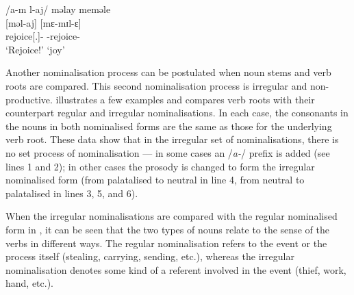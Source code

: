 \ea \label{ex:4:19}
\textup{/a-m l-aj/ \hspace{10pt}   məlay  \hspace{70pt}    meməle}\\
\hspace{55pt}   [məl-aj]  \hspace{60pt}    [mɛ-mɪl-ɛ]\\
\hspace{55pt}      rejoice[{\twoS}.{\IMP}]-{\CL} \hspace{20pt} {\NOM}{}-rejoice-{\CL}\\
\glt \hspace{55pt} ‘Rejoice!’ \hspace{55pt}   ‘joy’
\z

Another nominalisation process can be postulated when noun stems and verb roots are compared. This second nominalisation process is irregular and non-productive.  illustrates a few examples and compares verb roots with their counterpart regular and irregular nominalisations. In each case, the consonants in the nouns in both nominalised forms are the same as those for the underlying verb root. These data show that in the irregular set of nominalisations, there is no set process of nominalisation --- in some cases an /\textit{a-}/ prefix is added (see lines 1 and 2); in other cases the prosody is changed to form the irregular nominalised form (from palatalised to neutral in line 4, from neutral to palatalised in lines 3, 5, and 6). 

When the irregular nominalisations are compared with the regular nominal\-ised form in , it can be seen that the two types of nouns relate to the sense of the verbs in different ways. The regular nominalisation refers to the event or the process itself (stealing, carrying, sending, etc.), whereas the irregular nominalisation denotes some kind of a referent involved in the event (thief, work, hand, etc.). 


